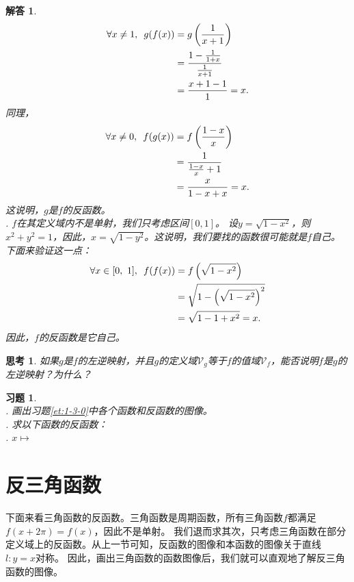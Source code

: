 \documentclass[12pt,UTF8]{ctexbook}
\newtheorem{sk}{思考}[section]
\newtheorem*{so}{解答}
\newtheorem{xt}{习题}[section]
\begin{document}
\begin{so}
\begin{align}
        \forall x\neq 1, \,\,\, g(f(x)) &= g\left(\frac{1}{x+1}\right) \notag \\
                                  &= \frac{1 - \frac{1}{1 + x}}{\frac{1}{x + 1}} \notag \\
                                  &= \frac{x + 1 - 1}{1} = x. \notag
    \end{align} 
    同理，
    \begin{align}
        \forall x \neq 0, \,\,\, f(g(x)) &= f\left(\frac{1 - x}{x}\right) \notag \\
                                  &= \frac{1}{\frac{1 - x}{x} + 1} \notag \\
                                  &= \frac{x}{1 - x + x} = x. \notag
    \end{align} 
    这说明，$g$是$f$的反函数。\\  
    . $f$在其定义域内不是单射，我们只考虑区间$[0,1]$。
    设$y = \sqrt{1 - x^2}$，则$x^2 + y^2 = 1$，因此，$x = \sqrt{1 - y^2}$。这说明，我们要找的函数很可能就是$f$自己。
    下面来验证这一点：
    \begin{align}
        \forall x\in [0,\,\,1], \,\,\, f(f(x)) &= f\left(\sqrt{1 - x^2}\right) \notag \\
                                  &= \sqrt{1 - \left(\sqrt{1 - x^2}\right)^2} \notag \\
                                  &= \sqrt{1 - 1 + x^2} = x. \notag
    \end{align} 
    因此，$f$的反函数是它自己。
\end{so}

\begin{sk}
    如果$g$是$f$的左逆映射，并且$g$的定义域$\mathcal{V}_g$等于$f$的值域$\mathcal{V}_f$，能否说明$f$是$g$的左逆映射？为什么？
\end{sk}
\begin{xt}
    \mbox{} \\
    . 画出习题\ref{et:1-3-0}中各个函数和反函数的图像。\\
    . 求以下函数的反函数：\\
    . $x\mapsto $
\end{xt}

\section{反三角函数}

下面来看三角函数的反函数。三角函数是周期函数，所有三角函数$f$都满足$f(x+2\pi) = f(x)$，因此不是单射。
我们退而求其次，只考虑三角函数在部分定义域上的反函数。从上一节可知，反函数的图像和本函数的图像关于直线$l: y = x$对称。
因此，画出三角函数的函数图像后，我们就可以直观地了解反三角函数的图像。
\end{document}
